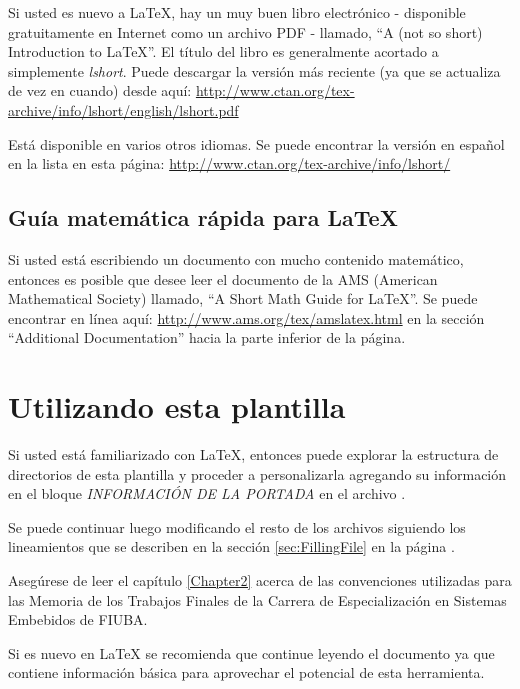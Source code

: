 Si usted es nuevo a \LaTeX{}, hay un muy buen libro electrónico - disponible gratuitamente en Internet como un archivo PDF - llamado, \enquote{A (not so short) Introduction to \LaTeX{}}. El título del libro es generalmente acortado a simplemente \emph{lshort}. Puede descargar la versión más reciente (ya que se actualiza de vez en cuando) desde aquí:
\url{http://www.ctan.org/tex-archive/info/lshort/english/lshort.pdf}

Está disponible en varios otros idiomas. Se puede encontrar la versión en español en la lista en esta página: \url{http://www.ctan.org/tex-archive/info/lshort/}


\subsection{Guía matemática rápida para \LaTeX{}}

Si usted está escribiendo un documento con mucho contenido matemático, entonces es posible que desee leer el documento de la AMS (American Mathematical Society) llamado, \enquote{A Short Math Guide for \LaTeX{}}. Se puede encontrar en línea aquí: \url{http://www.ams.org/tex/amslatex.html} en la sección \enquote{Additional Documentation} hacia la parte inferior de la página.



\section{Utilizando esta plantilla}

Si usted está familiarizado con \LaTeX{}, entonces puede explorar la estructura de directorios de esta plantilla y proceder a personalizarla agregando su información en el bloque \emph{INFORMACIÓN DE LA PORTADA} en el archivo .  

Se puede continuar luego modificando el resto de los archivos siguiendo los lineamientos que se describen en la sección \ref{sec:FillingFile} en la página \pageref{sec:FillingFile}.

Asegúrese de leer el capítulo \ref{Chapter2} acerca de las convenciones utilizadas para las Memoria de los Trabajos Finales de la Carrera de Especialización en Sistemas Embebidos de FIUBA.

Si es nuevo en \LaTeX{} se recomienda que continue leyendo el documento ya que contiene información básica para aprovechar el potencial de esta herramienta.


